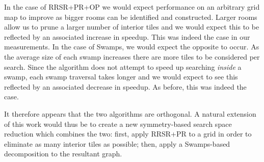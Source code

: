 In the case of RRSR+PR+OP we would expect performance on an arbitrary grid map to improve as bigger
rooms can be identified and constructed. 
Larger rooms allow us to prune a larger number of interior tiles and we would expect this to be reflected
by an associated increase in speedup. This was indeed the case in our measurements.
In the case of Swamps, we would expect the opposite to occur. As the average size of each swamp increases
there are more tiles to be considered per search. Since the algorithm does not attempt to speed up searching
\emph{inside} a swamp, each swamp traversal takes longer and we would expect to see this reflected
by an associated decrease in speedup. As before, this was indeed the case.

It therefore appears that the two algorithms are orthogonal.
A natural extension of this work would thus be to create a new symmetry-based search space reduction
which combines the two: first, apply RRSR+PR to a grid in order to eliminate as many interior tiles 
as possible; then, apply a Swamps-based decomposition to the resultant graph.

